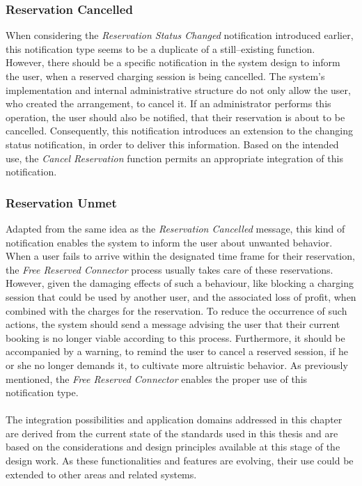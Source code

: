 \subsubsection{Reservation Cancelled}
\label{ch:Design:sec:Reservation System:ssec:Notification Capabilities:sssec:Reservation Cancelled}

When considering the \textit{Reservation Status Changed} notification introduced earlier, this notification type seems to be a duplicate of a still--existing function.
However, there should be a specific notification in the system design to inform the user, when a reserved charging session is being cancelled. The system's implementation and internal administrative structure do not only allow the user, who created the arrangement, to cancel it. 
If an administrator performs this operation, the user should also be notified, that their reservation is about to be cancelled. 
Consequently, this notification introduces an extension to the changing status notification, in order to deliver this information.
Based on the intended use, the \textit{Cancel Reservation} function permits an appropriate integration of this notification.

\subsubsection{Reservation Unmet}
\label{ch:Design:sec:Reservation System:ssec:Notification Capabilities:sssec:Reservation Unmet}

Adapted from the same idea as the \textit{Reservation Cancelled} message, this kind of notification enables the system to inform the user about unwanted behavior.
When a user fails to arrive within the designated time frame for their reservation, the \textit{Free Reserved Connector} process usually takes care of these reservations. 
However, given the damaging effects of such a behaviour, like blocking a charging session that could be used by another user, and the associated loss of profit, when combined with the charges for the reservation.
To reduce the occurrence of such actions, the system should send a message advising the user that their current booking is no longer viable according to this process. Furthermore, it should be accompanied by a warning, to remind the user to cancel a reserved session, if he or she no longer demands it, to cultivate more altruistic behavior.
As previously mentioned, the \textit{Free Reserved Connector} enables the proper use of this notification type. \\ \\
\noindent The integration possibilities and application domains addressed in this chapter are derived from the current state of the standards used in this thesis and are based on the considerations and design principles available at this stage of the design work. 
As these functionalities and features are evolving, their use could be extended to other areas and related systems.
